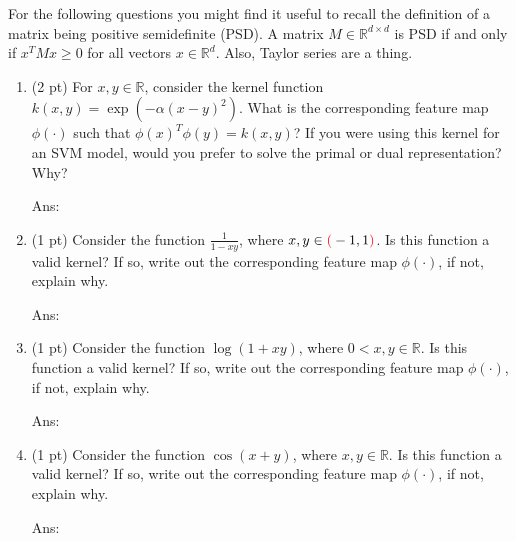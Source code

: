 \documentclass[10pt,letter,notitlepage]{article}
\newcommand{\red}[1]{{\color{red}#1}}
\newcommand{\ans}[1]{{\color{orange}\textsf{Ans}: #1}}
\newcounter{exercise}
\begin{document}
\begin{exercise}
      For the following questions you might find it useful to recall the definition of a matrix being positive semidefinite (PSD).
      A matrix $M \in \mathbb{R}^{d \times d}$ is PSD if and only if $x^T Mx \geq 0$ for all vectors $x \in \mathbb{R}^d$.
      Also, Taylor series are a thing.

  \begin{enumerate}
    \item (2 pt) For $x, y \in \mathbb{R}$, consider the kernel function $k(x, y) = \exp\left(-\alpha\left(x - y\right)^2\right)$.
      What is the corresponding feature map $\phi(\cdot)$ such that $\phi(x)^T \phi(y) = k(x, y)$?
      If you were using this kernel for an SVM model, would you prefer to solve the primal or dual representation? Why?

\ans{} 


    \item (1 pt) Consider the function $\frac{1}{1 - xy}$, where $x, y \in \red{(}-1, 1\red{)}$.
      Is this function a valid kernel?
      If so, write out the corresponding feature map $\phi(\cdot)$, if not, explain why.

\ans{} 
    \item (1 pt) Consider the function $\log (1 + xy)$, where $0 < x, y \in \mathbb{R}$.
      Is this function a valid kernel?
      If so, write out the corresponding feature map $\phi(\cdot)$, if not, explain why.

\ans{} 
    \item (1 pt) Consider the function $\cos(x + y)$, where $x, y \in \mathbb{R}$.
      Is this function a valid kernel?
      If so, write out the corresponding feature map $\phi(\cdot)$, if not, explain why.

\ans{} 
  \end{enumerate}
\end{exercise}
\end{document}
